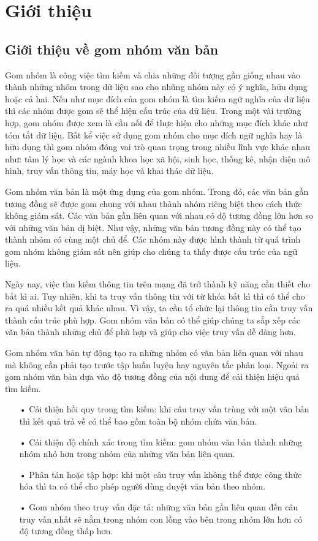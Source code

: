 \chapter{Giới thiệu}
\label{Chapter1}

\section{Giới thiệu về gom nhóm văn bản}

Gom nhóm là công việc tìm kiếm và chia những đối tượng gần giống nhau vào thành những nhóm trong dữ liệu sao cho nhũng nhóm này có ý nghĩa, hữu dụng hoặc cả hai. %
Nếu như mục đích của gom nhóm là tìm kiếm ngữ nghĩa của dữ liệu thì các nhóm được gom sẽ thể hiện cấu trúc của dữ liệu.
Trong một vài trường hợp, gom nhóm được xem là cầu nối để thực hiện cho những mục đích khác như tóm tắt dữ liệu.
Bất kể việc sử dụng gom nhóm cho mục đích ngữ nghĩa hay là hữu dụng thì gom nhóm đóng vai trò quan trọng trong nhiều lĩnh vực khác nhau như: tâm lý học và các ngành khoa học xã hội, sinh học, thống kê, nhận diện mô hình, truy vấn thông tin, máy học và khai thác dữ liệu.

Gom nhóm văn bản là một ứng dụng của gom nhóm.
Trong đó, các văn bản gần tương đồng sẽ được gom chung với nhau thành nhóm riêng biệt theo cách thức không giám sát.
Các văn bản gần liên quan với nhau có độ tương đồng lớn hơn so với những văn bản dị biệt.
Như vậy, những văn bản tương đồng này có thể tạo thành nhóm có cùng một chủ để.
Các nhóm này được hình thành từ quá trình gom nhóm không giám sát nên giúp cho chúng ta thấy được cấu trúc của ngữ liệu.

Ngày nay, việc tìm kiếm thông tin trên mạng đã trở thành kỹ năng cần thiết cho bất kì ai.
Tuy nhiên, khi ta truy vấn thông tin với từ khóa bất kì thì có thể cho ra quá nhiều kết quả khác nhau.
Vì vậy, ta cần tổ chức lại thông tin cần truy vấn thành cấu trúc phù hợp.
Gom nhóm văn bản có thể giúp chúng ta sắp xếp các văn bản thành những chủ để phù hợp và giúp cho việc truy vấn dễ dàng hơn.

Gom nhóm văn bản tự động tạo ra những nhóm có văn bản liên quan với nhau mà không cần phải tạo trước tập huấn luyện hay nguyên tắc phân loại. Ngoải ra gom nhóm văn bản dựa vào độ tương đồng của nội dung để cải thiện hiệu quả tìm kiếm.
\begin{enumerate}
\item[•]Cải thiện hồi quy trong tìm kiếm: khi câu truy vấn trùng với một văn bản thì kết quả trả về có thể bao gồm toàn bộ nhóm chứa văn bản.
\item[•]Cải thiện độ chính xác trong tìm kiếm: gom nhóm văn bản thành những nhóm nhỏ hơn trong nhóm của những văn bản liên quan.
\item[•]Phân tán hoặc tập hợp: khi một câu truy vấn không thể được công thức hóa thì ta có thể cho phép người dùng duyệt văn bản theo nhóm.
\item[•]Gom nhóm theo truy vấn đặc tả: những văn bản gần liên quan đến câu truy vấn nhất sẽ nằm trong nhóm con lồng vào bên trong nhóm lớn hơn có độ tương đồng thấp hơn.
\end{enumerate}

